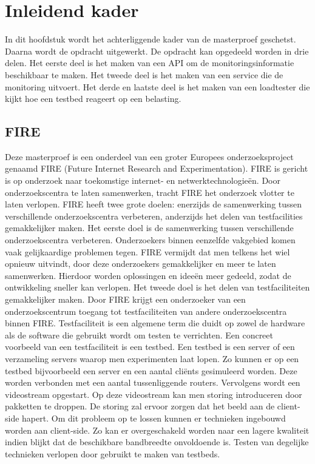 \chapter{Inleidend kader}
{\samenvatting
In dit hoofdstuk wordt het achterliggende kader van de masterproef geschetst. Daarna wordt de opdracht uitgewerkt. De opdracht kan opgedeeld worden in drie delen. Het eerste deel is het maken van een API om de monitoringsinformatie beschikbaar te maken. Het tweede deel is het maken van een service die de monitoring uitvoert. Het derde en laatste deel is het maken van een loadtester die kijkt hoe een testbed reageert op een belasting.}

\section{FIRE}
\npar
Deze masterproef is een onderdeel van een groter Europees onderzoeksproject genaamd FIRE (Future Internet Research and Experimentation). FIRE is gericht is op onderzoek naar toekomstige internet- en netwerktechnologie\"en. Door onderzoekscentra te laten samenwerken\citep{Fire-what-is}, tracht FIRE het onderzoek vlotter te laten verlopen. FIRE heeft twee grote doelen: enerzijds de samenwerking tussen verschillende onderzoekscentra verbeteren, anderzijds het delen van testfacilities gemakkelijker maken.
\npar
Het eerste doel is de samenwerking tussen verschillende onderzoekscentra verbeteren. Onderzoekers binnen eenzelfde vakgebied komen vaak gelijkaardige problemen tegen. FIRE vermijdt dat men telkens het wiel opnieuw uitvindt, door deze onderzoekers gemakkelijker en meer te laten samenwerken. Hierdoor worden oplossingen en idee\"en meer gedeeld, zodat de ontwikkeling sneller kan verlopen.
\clearpage
\npar
Het tweede doel is het delen van testfaciliteiten gemakkelijker  maken. Door FIRE krijgt een onderzoeker van een onderzoekscentrum toegang tot testfaciliteiten van andere onderzoekscentra binnen FIRE. Testfaciliteit is een algemene term die duidt op zowel de hardware als de software die gebruikt wordt om testen te verrichten. Een concreet voorbeeld van een testfaciliteit is een testbed. Een testbed is een server of een verzameling servers waarop men experimenten laat lopen. 
\npar
Zo kunnen er op een testbed bijvoorbeeld een server en een aantal cli\"ents gesimuleerd worden. Deze worden verbonden met een aantal tussenliggende routers. Vervolgens wordt een videostream opgestart. Op deze videostream kan men storing introduceren door pakketten te droppen. De storing zal ervoor zorgen dat het beeld aan de client-side hapert. Om dit probleem op te lossen kunnen er technieken ingebouwd worden aan client-side. Zo kan er overgeschakeld worden naar een lagere kwaliteit indien blijkt dat de beschikbare bandbreedte onvoldoende is. Testen van degelijke technieken verlopen door gebruikt te maken van testbeds.

